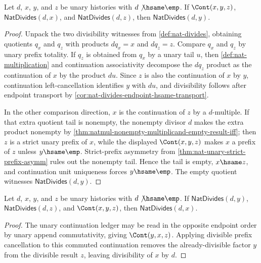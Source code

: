 \begin{lemma}
\label{lem:nat-divides-prefix-cancellation}
Let $d$, $x$, $y$, and $z$ be unary histories with $d\not\hsame\emp$. If $\Cont(x,y,z)$, $\mathsf{NatDivides}(d,x)$, and $\mathsf{NatDivides}(d,z)$, then $\mathsf{NatDivides}(d,y)$.
\end{lemma}
\begin{proof}
Unpack the two divisibility witnesses from \autoref{def:nat-divides}, obtaining quotients $q_x$ and $q_z$ with products $d q_x=x$ and $d q_z=z$. Compare $q_x$ and $q_z$ by unary prefix totality. If $q_z$ is obtained from $q_x$ by a unary tail $u$, then \autoref{def:nat-multiplication} and continuation associativity decompose the $d q_z$ product as the continuation of $x$ by the product $d u$. Since $z$ is also the continuation of $x$ by $y$, continuation left-cancellation identifies $y$ with $d u$, and divisibility follows after endpoint transport by \autoref{cor:nat-divides-endpoint-hsame-transport}.

In the other comparison direction, $x$ is the continuation of $z$ by a $d$-multiple. If that extra quotient tail is nonempty, the nonempty divisor $d$ makes the extra product nonempty by \autoref{thm:natmul-nonempty-multiplicand-empty-result-iff}; then $z$ is a strict unary prefix of $x$, while the displayed $\Cont(x,y,z)$ makes $x$ a prefix of $z$ unless $y\hsame\emp$. Strict-prefix asymmetry from \autoref{thm:nat-unary-strict-prefix-asymm} rules out the nonempty tail. Hence the tail is empty, $x\hsame z$, and continuation unit uniqueness forces $y\hsame\emp$. The empty quotient witnesses $\mathsf{NatDivides}(d,y)$.
\end{proof}

\begin{theorem}
\label{thm:nat-divides-cont-left-factor}
Let $d$, $x$, $y$, and $z$ be unary histories with $d\not\hsame\emp$. If
$\mathsf{NatDivides}(d,y)$, $\mathsf{NatDivides}(d,z)$, and $\Cont(x,y,z)$,
then $\mathsf{NatDivides}(d,x)$.
\end{theorem}
\begin{proof}
The unary continuation ledger may be read in the opposite endpoint order by
unary append commutativity, giving $\Cont(y,x,z)$. Applying divisible prefix
cancellation to this commuted continuation removes the already-divisible
factor $y$ from the divisible result $z$, leaving divisibility of $x$ by $d$.
\end{proof}

